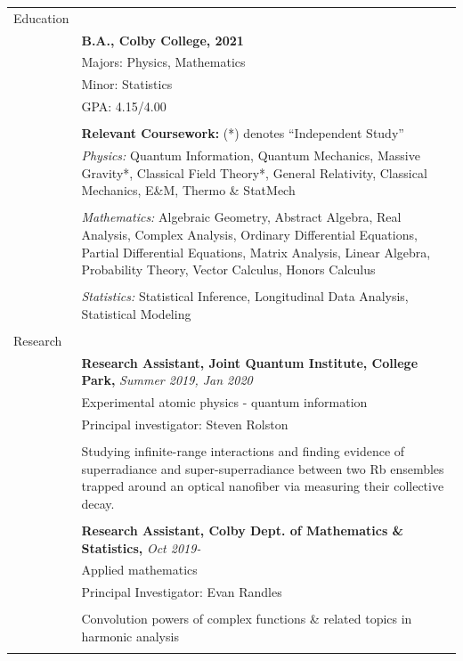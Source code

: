 \documentclass[10pt]{article}
\begin{document}
\noindent \begin{longtable}{ l m{13.5cm}   }

	
  \large{Education}    	& \\ 
  						& \textbf{B.A., Colby College, 2021} \\
     				 	& Majors: Physics, Mathematics \\
     				 	& Minor: Statistics  \\
     					& GPA: 4.15/4.00 \\
	 					& \\
	 					& \textbf{Relevant Coursework:} (*) denotes ``Independent Study'' \\
	 					& \textit{Physics:} Quantum Information, Quantum Mechanics, Massive Gravity*, Classical Field Theory*,  General Relativity, Classical Mechanics, E\&M, Thermo \& StatMech\\  \vspace{-9pt}
	 					& \\
	 					& \textit{Mathematics:} Algebraic Geometry, Abstract Algebra, Real Analysis, Complex Analysis, Ordinary Differential Equations, Partial Differential Equations, Matrix Analysis, Linear Algebra, Probability Theory, Vector Calculus, Honors Calculus\\   \vspace{-9pt}
	 					& \\ 
	 					& \textit{Statistics:} Statistical Inference, Longitudinal Data Analysis, Statistical Modeling\\
	 					& \\
    
        
  \large{Research}      & \\  
  						& \textbf{Research Assistant, Joint Quantum Institute, College Park,} \textit{Summer 2019, Jan 2020}  \\
  						& Experimental atomic physics - quantum information \\
     					& Principal investigator:  Steven Rolston\\  \vspace{-9pt}
     					& \\
     					& Studying infinite-range interactions and finding evidence of superradiance and super-superradiance between two Rb ensembles trapped around an optical nanofiber via measuring their collective decay. \\
     					& \\
     					
     					& \textbf{Research Assistant, Colby Dept. of Mathematics \& Statistics,} \textit{Oct 2019- }\\
     					& Applied mathematics \\
     					& Principal Investigator: Evan Randles  \\ \vspace{-9pt}
     					& \\
     					& Convolution powers of complex functions \& related topics in harmonic analysis \\
     					& \\
     					 

\end{longtable}
\end{document}
